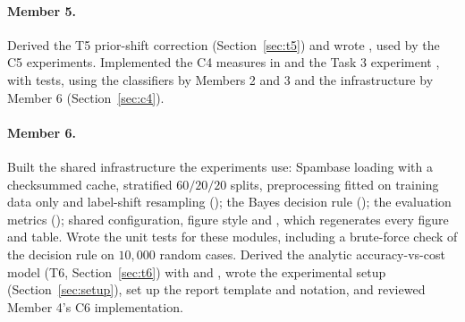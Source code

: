 \paragraph{Member 5.} Derived the T5 prior-shift correction (Section~\ref{sec:t5}) and wrote
, used by the C5 experiments. Implemented the C4 measures in
 and the Task 3 experiment ,
with tests, using the classifiers by Members 2 and 3 and the infrastructure by Member 6
(Section~\ref{sec:c4}).

\paragraph{Member 6.} Built the shared infrastructure the experiments use: Spambase loading with a
checksummed cache, stratified $60/20/20$ splits, preprocessing fitted on training data only and label-shift
resampling (); the Bayes decision rule (); the evaluation
metrics (); shared configuration, figure style and ,
which regenerates every figure and table. Wrote the unit tests for these modules, including a brute-force
check of the decision rule on $10{,}000$ random cases. Derived the analytic accuracy-vs-cost model (T6,
Section~\ref{sec:t6}) with  and , wrote
the experimental setup (Section~\ref{sec:setup}), set up the report template and notation, and reviewed
Member 4's C6 implementation.
